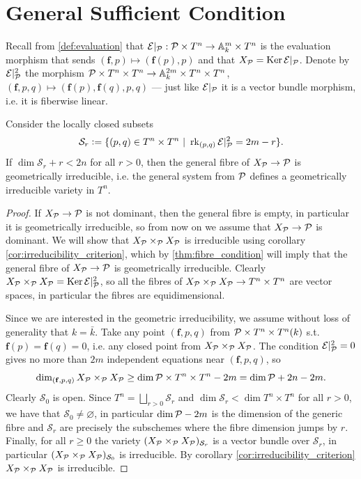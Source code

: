 \section{General Sufficient Condition}\label{sec:general}
Recall from \autoref{def:evaluation} that $\E|_\P: \P \times T^n \to \A^m_k \times T^n$ is the evaluation morphism that sends $(\mathbf f, p) \mapsto (\mathbf f(p), p)$ and that $X_\P = \Ker \E|_\P$. Denote by $\E|^2_\P$ the morphism $\P \times T^n \times T^n \to \A^{2m}_k \times T^n \times T^n$, $(\mathbf f, p, q) \mapsto (\mathbf f(p), \mathbf f(q), p, q)$ --- just like $\E|_\P$ it is a vector bundle morphism, i.e. it is fiberwise linear.

\begin{theorem}\label{thm:sufficient}
    Consider the locally closed subsets 
    \[
    \mathcal S_r \defeq \{ (p, q) \in T^n \times T^n\ |\ \rk_{(p, q)} \E|_\P^2 = 2m - r \}.
    \]
    If $\dim \mathcal S_r + r < 2n$ for all $r > 0$, then the general fibre of $X_\P \to \P$ is geometrically irreducible, i.e. the general system from $\P$ defines a geometrically irreducible variety in $T^n$.
\end{theorem}
\begin{proof}
    If $X_\P \to \P$ is not dominant, then the general fibre is empty, in particular it is geometrically irreducible, so from now on we assume that $X_\P \to \P$ is dominant.
    We will show that $X_\P \times_\P X_\P$ is irreducible using corollary \ref{cor:irreducibility_criterion}, which by \autoref{thm:fibre_condition} will imply that the general fibre of $X_\P \to \P$ is geometrically irreducible. Clearly $X_\P \times_\P X_\P = \Ker \E|_\P^2$, so all the fibres of $X_\P \times_\P X_\P \to T^n \times T^n$ are vector spaces, in particular the fibres are equidimensional. 
    
    Since we are interested in the geometric irreducibility, we assume without loss of generality that $k = \bar k$. Take any point $(\mathbf f, p, q)$ from $\P \times T^n \times T^n(k)$ s.t. $\mathbf f(p) = \mathbf f(q) = 0$, i.e. any closed point from $X_\P \times_\P X_\P$. The condition $\E|_\P^2 = 0$ gives no more than $2m$ independent equations near $(\mathbf f, p, q)$, so 
    \[
    \dim_{(\mathbf f, p, q)} X_\P \times_\P X_\P \ge \dim \P \times T^n \times T^n - 2m = \dim \P + 2n - 2m.
    \]
    Clearly $\mathcal S_0$ is open. Since $T^n = \bigsqcup_{r > 0} \mathcal S_r$ and $\dim \mathcal S_r < \dim T^n \times T^n$ for all $r > 0$, we have that $\mathcal S_0 \ne \varnothing$, in particular $\dim \P - 2m$ is the dimension of the generic fibre and $\mathcal S_r$ are precisely the subschemes where the fibre dimension jumps by $r$. Finally, for all $r \ge 0$ the variety $(X_\P \times_\P X_\P)_{\mathcal S_r}$ is a vector bundle over $\mathcal S_r$,  in particular $(X_\P \times_\P X_\P)_{\mathcal S_0}$ is irreducible. By corollary \ref{cor:irreducibility_criterion} $X_\P \times_\P X_\P$ is irreducible.
\end{proof}

